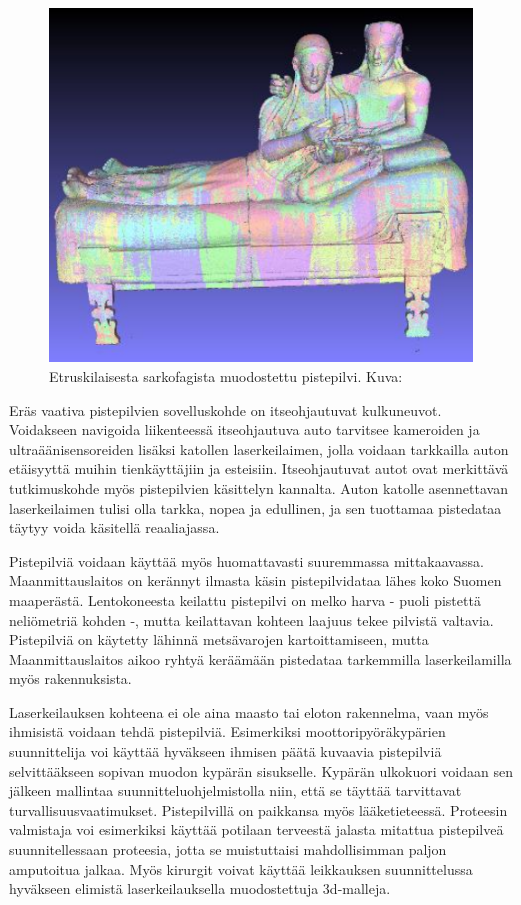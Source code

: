 \begin{figure}
    \centering
    \includegraphics[width=0.4\paperwidth]{img/sarkofagi.png}
    \caption{Etruskilaisesta sarkofagista muodostettu pistepilvi. Kuva: \cite{sarkofagi}}
    \label{sarko}
\end{figure}

Eräs vaativa pistepilvien sovelluskohde on itseohjautuvat kulkuneuvot. Voidakseen navigoida liikenteessä itseohjautuva auto tarvitsee kameroiden ja ultraäänisensoreiden lisäksi katollen laserkeilaimen, jolla voidaan tarkkailla auton etäisyyttä muihin tienkäyttäjiin ja esteisiin. Itseohjautuvat autot ovat merkittävä tutkimuskohde myös pistepilvien käsittelyn kannalta. Auton katolle asennettavan laserkeilaimen tulisi olla tarkka, nopea ja edullinen, ja sen tuottamaa pistedataa täytyy voida käsitellä reaaliajassa. \cite{car} 

Pistepilviä voidaan käyttää myös huomattavasti suuremmassa mittakaavassa. Maanmittauslaitos on kerännyt ilmasta käsin pistepilvidataa lähes koko Suomen maaperästä. Lentokoneesta keilattu pistepilvi on melko harva - puoli pistettä neliömetriä kohden -, mutta keilattavan kohteen laajuus tekee pilvistä valtavia. Pistepilviä on käytetty lähinnä metsävarojen kartoittamiseen, mutta Maanmittauslaitos aikoo ryhtyä keräämään pistedataa tarkemmilla laserkeilamilla myös rakennuksista. \cite{hs}

Laserkeilauksen kohteena ei ole aina maasto tai eloton rakennelma, vaan myös ihmisistä voidaan tehdä pistepilviä. Esimerkiksi moottoripyöräkypärien suunnittelija voi käyttää hyväkseen ihmisen päätä kuvaavia pistepilviä selvittääkseen sopivan muodon kypärän sisukselle. Kypärän ulkokuori voidaan sen jälkeen mallintaa suunnitteluohjelmistolla niin, että se täyttää tarvittavat turvallisuusvaatimukset. Pistepilvillä on paikkansa myös lääketieteessä. Proteesin valmistaja voi esimerkiksi käyttää potilaan terveestä jalasta mitattua pistepilveä suunnitellessaan proteesia, jotta se muistuttaisi mahdollisimman paljon amputoitua jalkaa. Myös kirurgit voivat käyttää leikkauksen suunnittelussa hyväkseen elimistä laserkeilauksella muodostettuja 3d-malleja. \cite{saxena}  

